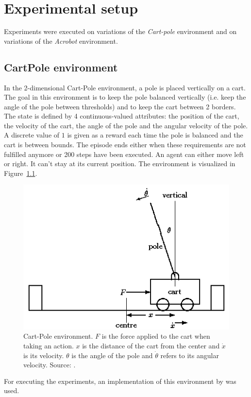 \chapter{Experimental setup}
Experiments were executed on variations of the \textit{Cart-pole} environment and on variations of the \textit{Acrobot} environment.\\

\section{CartPole environment} %
\label{sub:cartpole_environment}
In the 2-dimensional Cart-Pole environment, a pole is placed vertically on a cart. The goal in this environment is to keep the pole balanced vertically (i.e. keep the angle of the pole between thresholds) and to keep the cart between 2 borders.
The state is defined by 4 continuous-valued attributes: the position of the cart, the velocity of the cart, the angle of the pole and the angular velocity of the pole.
A discrete value of $1$ is given as a reward each time the pole is balanced and the cart is between bounds.
The episode ends either when these requirements are not fulfilled anymore or 200 steps have been executed.
An agent can either move left or right. It can't stay at its current position.
The environment is visualized in Figure~\ref{fig:cartpole}.
\begin{figure}[htb]
    \centering
    \includegraphics[width=.6\linewidth]{images/cartpole.png}
    \caption[Cart-Pole environment]{Cart-Pole environment. $F$ is the force applied to the cart when taking an action. $x$ is the distance of the cart from the center and $\dot{x}$ is its velocity. $\theta$ is the angle of the pole and $\dot{\theta}$ refers to its angular velocity. Source: \cite{grant1990modelling}.}
    \label{fig:cartpole}
\end{figure}
For executing the experiments, an implementation of this environment by \cite{Brockman2016OpenAIGym} was used.\\

